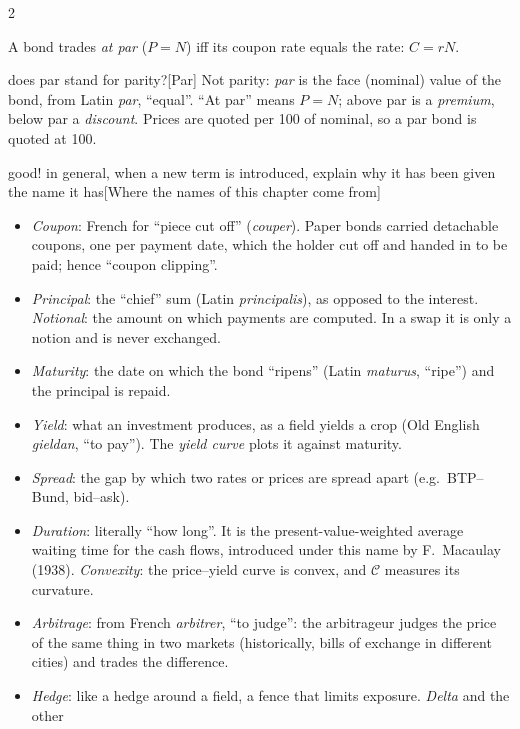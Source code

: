 \begin{paracol}{2}
\begin{corollary}\label{cor:par}
A bond trades \emph{at par} ($P=N$) iff its coupon rate equals the rate: $C = rN$.
\end{corollary} \begin{answer}{does par stand for parity?}[Par]
Not parity: \emph{par} is the face (nominal) value of the bond, from Latin \emph{par}, ``equal''. ``At par''
means $P=N$; above par is a \emph{premium}, below par a \emph{discount}. Prices are quoted per 100 of
nominal, so a par bond is quoted at 100.
\end{answer}\begin{answer}{good! in general, when a new term is introduced, explain why it has been given the name it has}[Where the names of this chapter come from]
\begin{itemize}
  \item \emph{Coupon}: French for ``piece cut off'' (\emph{couper}). Paper bonds carried detachable
        coupons, one per payment date, which the holder cut off and handed in to be paid; hence
        ``coupon clipping''.
  \item \emph{Principal}: the ``chief'' sum (Latin \emph{principalis}), as opposed to the interest.
        \emph{Notional}: the amount on which payments are computed. In a swap it is only a notion and is never
        exchanged.
  \item \emph{Maturity}: the date on which the bond ``ripens'' (Latin \emph{maturus}, ``ripe'') and the
        principal is repaid.
  \item \emph{Yield}: what an investment produces, as a field yields a crop (Old English \emph{gieldan},
        ``to pay''). The \emph{yield curve} plots it against maturity.
  \item \emph{Spread}: the gap by which two rates or prices are spread apart (e.g.\ BTP--Bund, bid--ask).
  \item \emph{Duration}: literally ``how long''. It is the present-value-weighted average waiting time for the cash
        flows, introduced under this name by F.~Macaulay (1938). \emph{Convexity}: the price--yield
        curve is convex, and $\mathcal C$ measures its curvature.
  \item \emph{Arbitrage}: from French \emph{arbitrer}, ``to judge'': the arbitrageur judges the price of the
        same thing in two markets (historically, bills of exchange in different cities) and trades the
        difference.
  \item \emph{Hedge}: like a hedge around a field, a fence that limits exposure. \emph{Delta} and the other

\end{itemize}
\end{answer}
\end{paracol}
